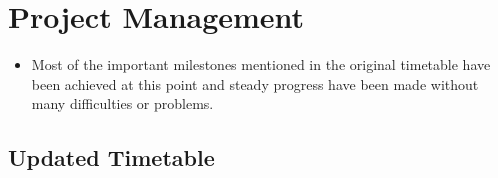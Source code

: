 \documentclass{article}
\begin{document}
	
	
	\section{Project Management}
	\begin{itemize}
		\item Most of the important milestones mentioned in the original timetable have been achieved at this point and steady progress have been made without many difficulties or problems.
	\end{itemize}
	
	\subsection{Updated Timetable} \label{timetable}
	
\end{document}
